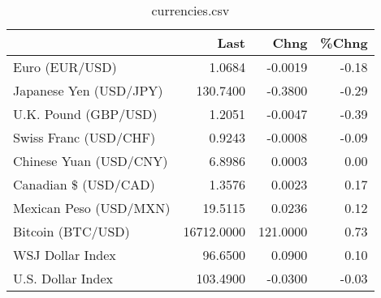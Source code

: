 \documentclass{article}%
\begin{document}
%


\begin{table}[htbp]%
\caption{currencies.csv}%
\centering%
\begin{adjustbox}{width=1\textwidth}%
\begin{tabular}{lrrr}
\toprule
                       &       Last &     Chng &  \%Chng \\
\midrule
        Euro (EUR/USD) &     1.0684 &  -0.0019 &  -0.18 \\
Japanese Yen (USD/JPY) &   130.7400 &  -0.3800 &  -0.29 \\
  U.K. Pound (GBP/USD) &     1.2051 &  -0.0047 &  -0.39 \\
 Swiss Franc (USD/CHF) &     0.9243 &  -0.0008 &  -0.09 \\
Chinese Yuan (USD/CNY) &     6.8986 &   0.0003 &   0.00 \\
  Canadian \$ (USD/CAD) &     1.3576 &   0.0023 &   0.17 \\
Mexican Peso (USD/MXN) &    19.5115 &   0.0236 &   0.12 \\
     Bitcoin (BTC/USD) & 16712.0000 & 121.0000 &   0.73 \\
      WSJ Dollar Index &    96.6500 &   0.0900 &   0.10 \\
     U.S. Dollar Index &   103.4900 &  -0.0300 &  -0.03 \\
\bottomrule
\end{tabular}
%
\end{adjustbox}%
\end{table}

%
\end{document}
